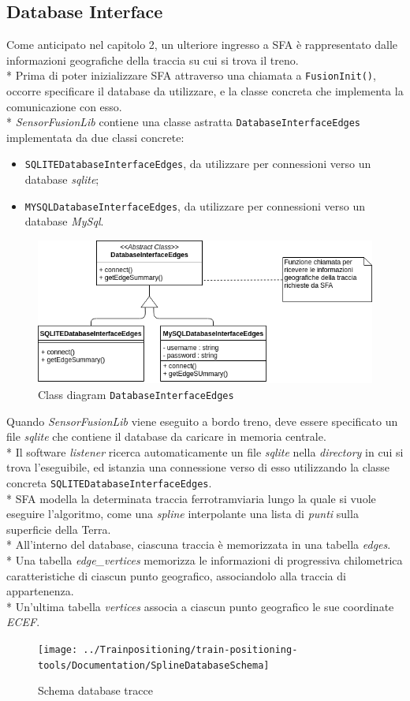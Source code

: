 \subsection{Database Interface}
Come anticipato nel capitolo 2, un ulteriore ingresso a SFA \`e rappresentato dalle informazioni geografiche della traccia su cui si trova il treno.\\*
Prima di poter inizializzare SFA attraverso una chiamata a \texttt{FusionInit()}, occorre specificare il database da utilizzare, e la classe concreta che implementa la comunicazione con esso.\\*
\emph{SensorFusionLib} contiene una classe astratta \texttt{DatabaseInterfaceEdges} implementata da due classi concrete:
\begin{itemize}
	\item \texttt{SQLITEDatabaseInterfaceEdges}, da utilizzare per connessioni verso un database \textit{sqlite};
	\item \texttt{MYSQLDatabaseInterfaceEdges}, da utilizzare per connessioni verso un database \textit{MySql}.
\end{itemize}
\begin{figure}[h]
	\centering
	\includegraphics[width=0.7\linewidth]{img/dbintface}
	\caption{Class diagram \texttt{DatabaseInterfaceEdges}}
	\label{fig:dbiface}
\end{figure}
Quando \emph{SensorFusionLib} viene eseguito a bordo treno, deve essere specificato un file \textit{sqlite} che contiene il database da caricare in memoria centrale.\\*
Il software \emph{listener} ricerca automaticamente un file \textit{sqlite} nella \emph{directory} in cui si trova l'eseguibile, ed istanzia una connessione verso di esso utilizzando la classe concreta \texttt{SQLITEDatabaseInterfaceEdges}.\\*
SFA modella la determinata traccia ferrotramviaria lungo la quale si vuole eseguire l'algoritmo, come una \emph{spline} interpolante una lista di \emph{punti} sulla superficie della Terra.\\*
All'interno del database, ciascuna traccia \`e memorizzata in una tabella \emph{edges}.\\*
Una tabella \emph{edge\_vertices} memorizza le informazioni di progressiva chilometrica caratteristiche di ciascun punto geografico, associandolo alla traccia di appartenenza.\\*
Un'ultima tabella \emph{vertices} associa a ciascun punto geografico le sue coordinate \emph{ECEF}.
\begin{figure}[h]
	\centering
	\texttt{[image: ../Trainpositioning/train-positioning-tools/Documentation/SplineDatabaseSchema]}
	\caption{Schema database tracce}
	\label{fig:dbschema}
\end{figure}\newpage
